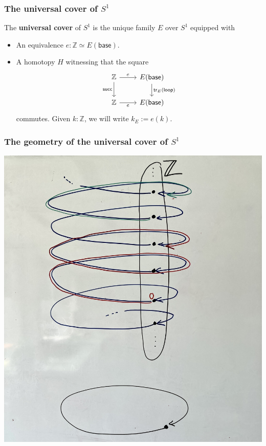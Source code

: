 \documentclass[handout]{beamer}
\newcommand{\Z}{\mathbb{Z}}
\newcommand{\sphere}[1]{S^{#1}}
\newcommand{\baseS}{\mathsf{base}}
\newcommand{\loopS}{\mathsf{loop}}
\newcommand{\tr}{\mathsf{tr}}
\newcommand{\succZ}{\mathsf{succ}}
\begin{document}
\begin{frame}
  \frametitle{The universal cover of $\sphere{1}$}
  
  \begin{definition}
    The \textbf{universal cover} of $\sphere{1}$ is the unique family $E$ over $\sphere{1}$ equipped with
    \begin{itemize}
    \item An equivalence $e:\Z\simeq E(\baseS)$.
    \item A homotopy $H$ witnessing that the square
      \begin{equation*}
        \begin{tikzcd}[ampersand replacement=\&]
          \Z \arrow[d,swap,"\succZ"] \arrow[r,"e"] \& E(\baseS) \arrow[d,"\tr_E(\loopS)"] \\
          \Z \arrow[r,swap,"e"] \& E(\baseS)
        \end{tikzcd}
      \end{equation*}
      commutes. Given $k:\Z$, we will write $k_E:=e(k)$. 
    \end{itemize}
  \end{definition}
\end{frame}

\begin{frame}
  \frametitle{The geometry of the universal cover of $\sphere{1}$}
  \begin{center}
    \includegraphics[width=.7\textwidth]{universal-cover-circle}
  \end{center}
\end{frame}
\end{document}
